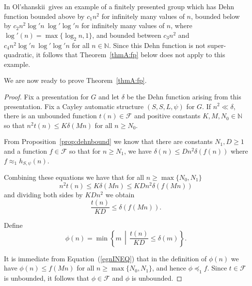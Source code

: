 \documentclass[11pt]{amsart}
\newcommand{\preceqF}{\preceq_1}
\newcommand{\approxF}{\approx_1}
\newcommand\Olshan{Ol'shanskii}
\theoremstyle{definition}
\newcommand\N{\mathbb N}
\newcommand\F{\mathcal F}
\renewcommand{\geq}{\geqslant} \renewcommand{\leq}{\leqslant} \renewcommand{\ge}{\geqslant} \renewcommand{\le}{\leqslant}
\begin{document}
 In \cite{WeirdQuadDehn}  \Olshan\ gives an example of a finitely presented group  which has Dehn function bounded above  by $c_1n^2$ for infinitely many values of $n$,  bounded below by $c_2n^2\log' n\ \log'\log' n$ for infinitely many values of $n$, where $\log'(n)=\max\{\log_2 n, 1\}$, and bounded between $c_3n^2$ and $c_4n^2\log'n\ \log'\log' n$ for all $n\in \N$. Since this Dehn function is not super-quadratic, it follows that  Theorem~\ref{thmA:fp} below does not apply to this example.


We are now ready to prove Theorem~\ref{thmA:fp}.

\ThmA*
\begin{proof}
Fix a presentation for $G$ and let $\delta$ be the Dehn function arising from this presentation. Fix a Cayley automatic structure $(S,S,L,\psi)$ for $G$.
If  $n^2 \ll \delta$,  there is an unbounded function $t(n) \in   \F$ and positive constants $K,M,N_0 \in \N$ so that $n^2t(n) \leq K\delta(Mn)$ for all $n \geq N_0$.



From Proposition~\ref{prop:dehnbound} we know that there are constants $N_1, D\geq 1$ and a function $f\in \F$ so that  for $n \geq N_1$, we have  $\delta(n) \leq Dn^2\delta(f(n))$ where $f\approxF h_{S,\psi}(n)$.

Combining these equations we have  that for all $n\geq \max\{N_0,N_1\}$
\[n^2t(n)\leq K\delta(Mn)\leq KDn^2\delta\left(f(Mn)\right)\]
and dividing both sides by $KDn^2$ we obtain
\begin{equation}\label{egnINEQ}
\frac{t(n)}{KD}\leq  \delta\left(f(Mn)\right).\end{equation}


Define
$$\phi(n) = \min\left\{m\, \middle|\,\frac{t(n)}{KD} \leq \delta(m)\right\}.$$

It is immediate from Equation~(\ref{egnINEQ}) that in the definition of $\phi(n)$ we have $\phi(n) \leq f(Mn)$ for all $n\geq \max\{N_0,N_1\}$, and hence $\phi \preceqF f$.  Since $t \in   \F$ is unbounded, it follows that $\phi \in \F$ and $\phi$ is unbounded.



\end{proof}
\end{document}
